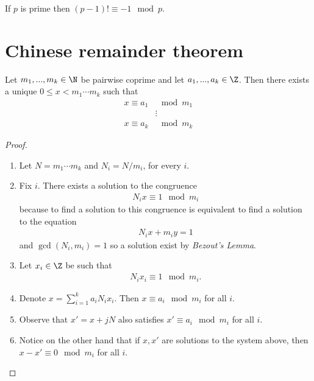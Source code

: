 \documentclass{article}
\begin{document}
\begin{theorem}[Wilson]
    If $p$ is prime then $(p-1)!\equiv -1 \mod p$. 
\end{theorem}

\section{Chinese remainder theorem}

\begin{theorem}
    Let $m_1,...,m_k\in\N$ be pairwise coprime and let $a_1,...,a_k\in\Z$. Then there exists a 
    unique $0\leq x<m_1\cdots m_k$ such that 
    \begin{align*}
        x\equiv a_1 & \mod m_1\\
                    & \vdots\\
        x\equiv a_k & \mod m_k
    \end{align*}
    \begin{proof}
        \begin{enumerate}
            \item Let $N=m_1\cdots m_k$ and $N_i=N/m_i$, for every $i$.
            \item Fix $i$. There exists a solution to the congruence \begin{align*}
                N_ix\equiv 1 \mod m_i
            \end{align*}
            because to find a solution to this congruence is equivalent to find a solution to 
            the equation 
            \begin{align*}
                N_ix +m_iy=1
            \end{align*}
            and $\gcd(N_i,m_i)=1$ so a solution exist by \emph{Bezout's Lemma}.
            \item Let $x_i\in\Z$ be such that \begin{align*}
                N_ix_i\equiv 1 \mod m_i.
            \end{align*}
            \item Denote $x=\sum_{i=1}^k a_iN_ix_i$. Then $x\equiv a_i \mod m_i$ for all $i$.
            \item Observe that $x'=x+jN$ also satisfies $x'\equiv a_i \mod m_i$ for all $i$.
            \item Notice on the other hand that if $x,x'$ are solutions to the system above, then 
                $x-x'\equiv 0 \mod m_i$ for all $i$.
        \end{enumerate}
    \end{proof}
\end{theorem}
\end{document}
